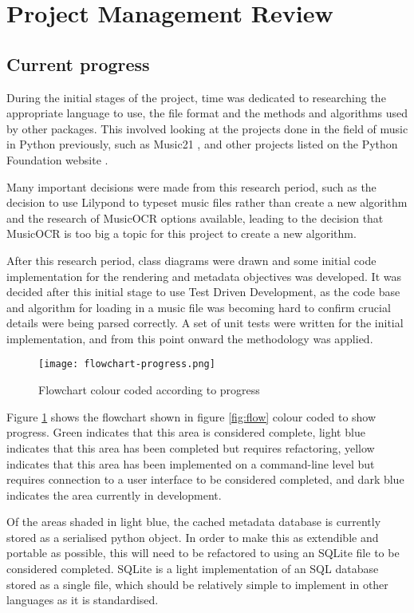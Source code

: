 \section{Project Management Review}
\subsection{Current progress}

During the initial stages of the project, time was dedicated to researching the appropriate language to use, the file format and the methods and algorithms used by other packages. This involved looking at the projects done in the field of music in Python previously, such as Music21 \parencite{Music21}, and other projects listed on the Python Foundation website \parencite{pmus}. 

Many important decisions were made from this research period, such as the decision to use Lilypond to typeset music files rather than create a new algorithm and the research of MusicOCR options available, leading to the decision that MusicOCR is too big a topic for this project to create a new algorithm.


After this research period, class diagrams were drawn and some initial code implementation for the rendering and metadata objectives was developed. It was decided after this initial stage to use Test Driven Development, as the code base and algorithm for loading in a music file was becoming hard to confirm crucial details were being parsed correctly. A set of unit tests were written for the initial implementation, and from this point onward the methodology was applied.

\begin{figure}[h]
    \centering
    \texttt{[image: flowchart-progress.png]}
    \caption{Flowchart colour coded according to progress}
    \label{fig:colours}
\end{figure}
Figure \ref{fig:colours} shows the flowchart shown in figure \ref{fig:flow} colour coded to show progress. Green indicates that this area is considered complete, light blue indicates that this area has been completed but requires refactoring, yellow indicates that this area has been implemented on a command-line level but requires connection to a user interface to be considered completed, and dark blue indicates the area currently in development.

Of the areas shaded in light blue, the cached metadata database is currently stored as a serialised python object. In order to make this as extendible and portable as possible, this will need to be refactored to using an SQLite file to be considered completed. SQLite is a light implementation of an SQL database stored as a single file, which should be relatively simple to implement in other languages as it is standardised.
